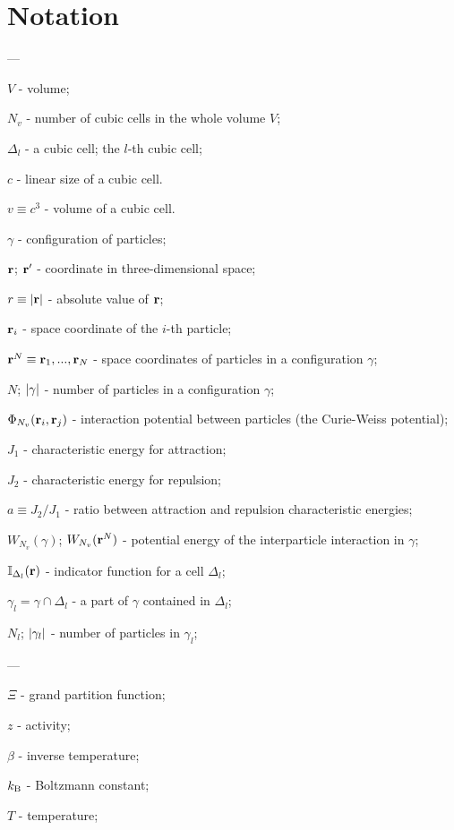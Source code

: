 \section{Notation}

---

$V$ - volume;

$N_v$ - number of cubic cells in the whole volume $V$;

$\Delta_{l}$ - a cubic cell; the $l$-th cubic cell;

$c$ - linear size of a cubic cell.

$v \equiv c^3$ - volume of a cubic cell.

$\gamma$ - configuration of particles;

$\vb r$; $\vb{r}'$ - coordinate in three-dimensional space;

$r \equiv \abs{\vb r}$ - absolute value of $\vb r$;

$\vb{r}_i$ - space coordinate of the $i$-th particle;

$\vb{r}^N \equiv \vb{r}_1, ..., \vb{r}_N$ - space coordinates of particles in a configuration $\gamma$;

$N$; $\abs{\gamma}$ - number of particles in a configuration $\gamma$;

$\Phi_{N_v}(\vb{r}_i, \vb{r}_j)$ - interaction potential between particles (the Curie-Weiss potential);

$J_1$ - characteristic energy for attraction;

$J_2$ - characteristic energy for repulsion;

$a \equiv J_2/J_1$ - ratio between attraction and repulsion characteristic energies;

$W_{N_v}(\gamma)$; $W_{N_v}(\vb{r}^N)$ - potential energy of the interparticle interaction in $\gamma$;

$\mathbb{I}_{\Delta_l} (\vb{r})$ - indicator function for a cell $\Delta_{l}$;

$\gamma_l = \gamma \cap \Delta_l$ - a part of $\gamma$ contained in $\Delta_l$;

$N_l$; $\abs{\gamma_l}$ - number of particles in $\gamma_l$;

---

$\Xi$ - grand partition function;

$z$ - activity;

$\beta$ - inverse temperature;

$k_{\rm B}$ - Boltzmann constant;

$T$ - temperature;

